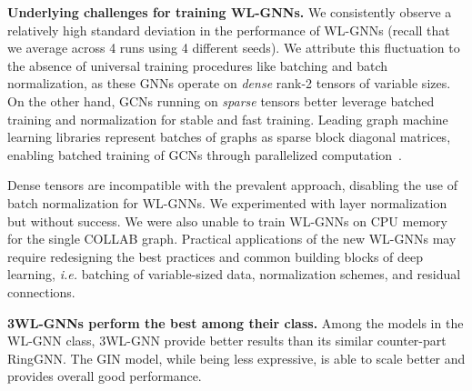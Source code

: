 \documentclass{article}
\begin{document}
{\bf Underlying challenges for training WL-GNNs.} 
We consistently observe a relatively high standard deviation in the performance of WL-GNNs (recall that we average across 4 runs using 4 different seeds). 
We attribute this fluctuation to the absence of universal training procedures like batching and batch normalization, as these GNNs operate on {\it dense} rank-2 tensors of variable sizes. 
On the other hand, GCNs running on {\it sparse} tensors better leverage batched training and normalization for stable and fast training.
Leading graph machine learning libraries represent batches of graphs as sparse block diagonal matrices, enabling batched training of GCNs through parallelized computation~\cite{jia2019redundancy}.

\vspace{-0.1cm}
Dense tensors are incompatible with the prevalent approach, disabling the use of batch normalization for WL-GNNs.
We experimented with layer normalization~\cite{ba2016layer} but without success.
We were also unable to train WL-GNNs on CPU memory for the single COLLAB graph.
Practical applications of the new WL-GNNs may require redesigning the best practices and common building blocks of deep learning, \textit{i.e.} batching of variable-sized data, normalization schemes, and residual connections.




{\bf 3WL-GNNs perform the best among their class.} Among the models in the WL-GNN class, 3WL-GNN provide better results than its similar counter-part RingGNN. The GIN model, while being less expressive, is able to scale better and provides overall good performance.
\end{document}
